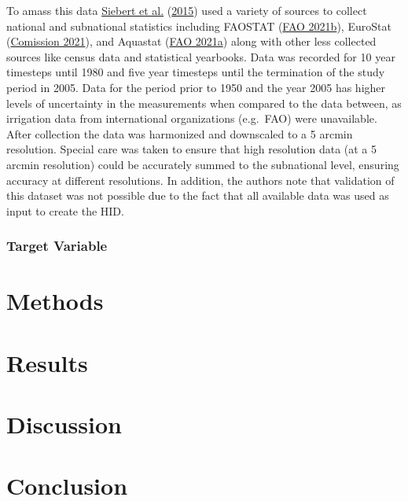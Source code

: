 \documentclass[12pt,twoside]{reedthesis}
\begin{document}
To amass this data \protect\hyperlink{ref-siebertGlobalDataSet2015}{Siebert et al.} (\protect\hyperlink{ref-siebertGlobalDataSet2015}{2015}) used a variety of sources to collect national and subnational statistics including FAOSTAT (\protect\hyperlink{ref-faoFAOSTAT2021}{FAO 2021b}), EuroStat (\protect\hyperlink{ref-europeancomissionEurostatDatabase2021}{Comission 2021}), and Aquastat (\protect\hyperlink{ref-faoAQUASTAT2021}{FAO 2021a}) along with other less collected sources like census data and statistical yearbooks. Data was recorded for 10 year timesteps until 1980 and five year timesteps until the termination of the study period in 2005. Data for the period prior to 1950 and the year 2005 has higher levels of uncertainty in the measurements when compared to the data between, as irrigation data from international organizations (e.g.~FAO) were unavailable. After collection the data was harmonized and downscaled to a 5 arcmin resolution. Special care was taken to ensure that high resolution data (at a 5 arcmin resolution) could be accurately summed to the subnational level, ensuring accuracy at different resolutions. In addition, the authors note that validation of this dataset was not possible due to the fact that all available data was used as input to create the HID.

\hypertarget{irrfrac}{%
\subsection{Target Variable}\label{irrfrac}}

\hypertarget{methods}{%
\chapter{Methods}\label{methods}}

\hypertarget{results}{%
\chapter{Results}\label{results}}

\hypertarget{discuss}{%
\chapter{Discussion}\label{discuss}}

\hypertarget{conclusion}{%
\chapter{Conclusion}\label{conclusion}}
\end{document}
